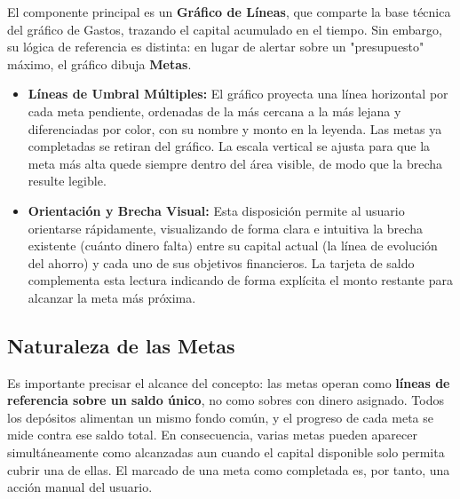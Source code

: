 El componente principal es un \textbf{Gráfico de Líneas}, que comparte la base técnica del gráfico de Gastos, trazando el capital acumulado en el tiempo. Sin embargo, su lógica de referencia es distinta: en lugar de alertar sobre un "presupuesto" máximo, el gráfico dibuja \textbf{Metas}.
\begin{itemize}
    \item \textbf{Líneas de Umbral Múltiples:} El gráfico proyecta una línea horizontal por cada meta pendiente, ordenadas de la más cercana a la más lejana y diferenciadas por color, con su nombre y monto en la leyenda. Las metas ya completadas se retiran del gráfico. La escala vertical se ajusta para que la meta más alta quede siempre dentro del área visible, de modo que la brecha resulte legible.
    \item \textbf{Orientación y Brecha Visual:} Esta disposición permite al usuario orientarse rápidamente, visualizando de forma clara e intuitiva la brecha existente (cuánto dinero falta) entre su capital actual (la línea de evolución del ahorro) y cada uno de sus objetivos financieros. La tarjeta de saldo complementa esta lectura indicando de forma explícita el monto restante para alcanzar la meta más próxima.
\end{itemize}

\subsection{Naturaleza de las Metas}
Es importante precisar el alcance del concepto: las metas operan como \textbf{líneas de referencia sobre un saldo único}, no como sobres con dinero asignado. Todos los depósitos alimentan un mismo fondo común, y el progreso de cada meta se mide contra ese saldo total. En consecuencia, varias metas pueden aparecer simultáneamente como alcanzadas aun cuando el capital disponible solo permita cubrir una de ellas. El marcado de una meta como completada es, por tanto, una acción manual del usuario.